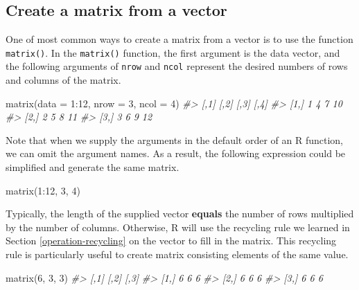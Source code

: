 \documentclass[
]{book}
\newenvironment{Shaded}{\begin{snugshade}}{\end{snugshade}}
\newcommand{\AttributeTok}[1]{\textcolor[rgb]{0.77,0.63,0.00}{#1}}
\newcommand{\CommentTok}[1]{\textcolor[rgb]{0.56,0.35,0.01}{\textit{#1}}}
\newcommand{\DecValTok}[1]{\textcolor[rgb]{0.00,0.00,0.81}{#1}}
\newcommand{\FunctionTok}[1]{\textcolor[rgb]{0.00,0.00,0.00}{#1}}
\newcommand{\NormalTok}[1]{#1}
\newcommand{\SpecialCharTok}[1]{\textcolor[rgb]{0.00,0.00,0.00}{#1}}
\begin{document}
\hypertarget{create-a-matrix-from-a-vector}{%
\subsection{Create a matrix from a vector}\label{create-a-matrix-from-a-vector}}

One of most common ways to create a matrix from a vector is to use the function \texttt{matrix()}. In the \texttt{matrix()} function, the first argument is the data vector, and the following arguments of \texttt{nrow} and \texttt{ncol} represent the desired numbers of rows and columns of the matrix.

\begin{Shaded}
\begin{Highlighting}[]
\FunctionTok{matrix}\NormalTok{(}\AttributeTok{data =} \DecValTok{1}\SpecialCharTok{:}\DecValTok{12}\NormalTok{, }\AttributeTok{nrow =} \DecValTok{3}\NormalTok{, }\AttributeTok{ncol =} \DecValTok{4}\NormalTok{)}
\CommentTok{\#\textgreater{}      [,1] [,2] [,3] [,4]}
\CommentTok{\#\textgreater{} [1,]    1    4    7   10}
\CommentTok{\#\textgreater{} [2,]    2    5    8   11}
\CommentTok{\#\textgreater{} [3,]    3    6    9   12}
\end{Highlighting}
\end{Shaded}

Note that when we supply the arguments in the default order of an R function, we can omit the argument names. As a result, the following expression could be simplified and generate the same matrix.

\begin{Shaded}
\begin{Highlighting}[]
\FunctionTok{matrix}\NormalTok{(}\DecValTok{1}\SpecialCharTok{:}\DecValTok{12}\NormalTok{, }\DecValTok{3}\NormalTok{, }\DecValTok{4}\NormalTok{)}
\end{Highlighting}
\end{Shaded}

Typically, the length of the supplied vector \textbf{equals} the number of rows multiplied by the number of columns. Otherwise, R will use the recycling rule we learned in Section \ref{operation-recycling} on the vector to fill in the matrix. This recycling rule is particularly useful to create matrix consisting elements of the same value.

\begin{Shaded}
\begin{Highlighting}[]
\FunctionTok{matrix}\NormalTok{(}\DecValTok{6}\NormalTok{, }\DecValTok{3}\NormalTok{, }\DecValTok{3}\NormalTok{)}
\CommentTok{\#\textgreater{}      [,1] [,2] [,3]}
\CommentTok{\#\textgreater{} [1,]    6    6    6}
\CommentTok{\#\textgreater{} [2,]    6    6    6}
\CommentTok{\#\textgreater{} [3,]    6    6    6}
\end{Highlighting}
\end{Shaded}
\end{document}
